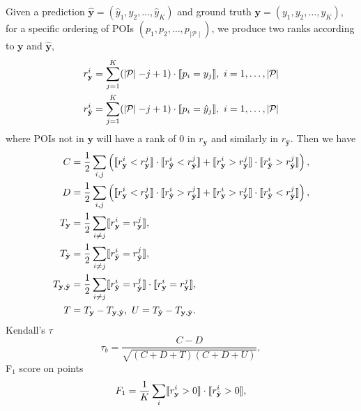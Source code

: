 Given a prediction $\hat{\mathbf{y}} = (\hat{y}_1, \hat{y}_2, \dots, \hat{y}_K)$ and ground truth $\mathbf{y} = (y_1, y_2, \dots, y_K)$,
for a specific ordering of POIs $(p_1, p_2, \dots, p_{\mid\mathcal{P}\mid})$,
we produce two ranks according to $\mathbf{y}$ and $\hat{\mathbf{y}}$,
\begin{align*}
r_{\mathbf{y}}^i       &= \sum_{j=1}^K (\mid\!\! \mathcal{P} \!\!\mid - j + 1) \cdot \llb p_i = y_j \rrb,~
i = 1, \dots, \mid\!\! \mathcal{P} \!\!\mid \\
r_{\hat{\mathbf{y}}}^i &= \sum_{j=1}^K (\mid\!\! \mathcal{P} \!\!\mid - j + 1) \cdot \llb p_i = \hat{y}_j \rrb,~ 
i = 1, \dots, \mid\!\! \mathcal{P} \!\!\mid
\end{align*}
where POIs not in $\mathbf{y}$ will have a rank of $0$ in $r_{\mathbf{y}}$ and similarly in $r_{\hat{\mathbf{y}}}$.
Then we have
\begin{align*}
C &= \frac{1}{2} \sum_{i,j} \left(\llbracket r_{\mathbf{y}}^i < r_{\mathbf{y}}^j \rrbracket \cdot \llbracket r_{\hat{\mathbf{y}}}^i < r_{\hat{\mathbf{y}}}^j \rrbracket +
     \llbracket r_{\mathbf{y}}^i > r_{\mathbf{y}}^j \rrbracket \cdot \llbracket r_{\hat{\mathbf{y}}}^i > r_{\hat{\mathbf{y}}}^j \rrbracket \right), \\
D &= \frac{1}{2} \sum_{i,j} \left(\llbracket r_{\mathbf{y}}^i < r_{\mathbf{y}}^j \rrbracket \cdot \llbracket r_{\hat{\mathbf{y}}}^i > r_{\hat{\mathbf{y}}}^j \rrbracket +
     \llbracket r_{\mathbf{y}}^i > r_{\mathbf{y}}^j \rrbracket \cdot \llbracket r_{\hat{\mathbf{y}}}^i < r_{\hat{\mathbf{y}}}^j \rrbracket \right), \\
T_{\mathbf{y}}       &= \frac{1}{2} \sum_{i \ne j} \llbracket r_{\mathbf{y}}^i = r_{\mathbf{y}}^j \rrbracket, \\
T_{\hat{\mathbf{y}}} &= \frac{1}{2} \sum_{i \ne j} \llbracket r_{\hat{\mathbf{y}}}^i = r_{\hat{\mathbf{y}}}^j \rrbracket, \\
T_{\mathbf{y},\hat{\mathbf{y}}} &= \frac{1}{2} \sum_{i \ne j} \llbracket r_{\hat{\mathbf{y}}}^i = r_{\hat{\mathbf{y}}}^j \rrbracket \cdot
                                   \llbracket r_{\mathbf{y}}^i = r_{\mathbf{y}}^j \rrbracket, \\
T &= T_{\mathbf{y}} - T_{\mathbf{y},\hat{\mathbf{y}}},~ U = T_{\hat{\mathbf{y}}} - T_{\mathbf{y},\hat{\mathbf{y}}}.
\end{align*}
\noindent
Kendall's $\tau$
\begin{equation*}
\tau_b = \frac{C - D}{\sqrt{(C + D + T) (C + D + U)}},
\end{equation*}
F$_1$ score on points 
\begin{equation*}
F_1 = \frac{1}{K} \sum_i \llbracket r_{\mathbf{y}}^i > 0 \rrbracket \cdot \llbracket r_{\hat{\mathbf{y}}}^i > 0 \rrbracket,
\end{equation*}
